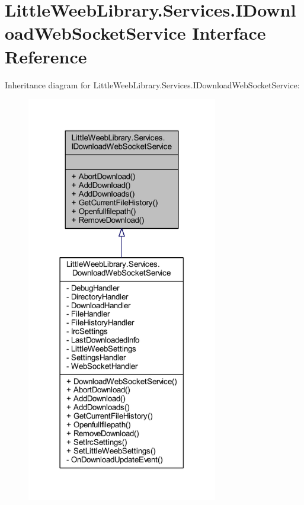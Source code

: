 \hypertarget{interface_little_weeb_library_1_1_services_1_1_i_download_web_socket_service}{}\section{Little\+Weeb\+Library.\+Services.\+I\+Download\+Web\+Socket\+Service Interface Reference}
\label{interface_little_weeb_library_1_1_services_1_1_i_download_web_socket_service}


Inheritance diagram for Little\+Weeb\+Library.\+Services.\+I\+Download\+Web\+Socket\+Service\+:\nopagebreak
\begin{figure}[H]
\begin{center}
\leavevmode
\includegraphics[width=236pt]{interface_little_weeb_library_1_1_services_1_1_i_download_web_socket_service__inherit__graph}
\end{center}
\end{figure}


